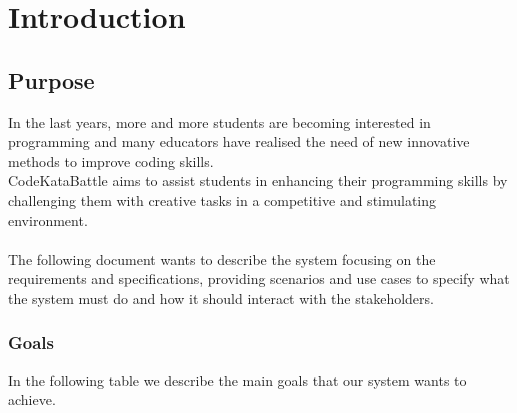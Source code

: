 \chapter{Introduction}

\section{Purpose}
In the last years, more and more students are becoming interested in programming and many educators have realised 
the need of new innovative methods to improve coding skills. \\
CodeKataBattle aims to assist students in enhancing their programming skills by challenging them with creative tasks
 in a competitive and stimulating environment. \\
 \\
 The following document wants to describe the system focusing on the requirements and specifications, providing scenarios 
 and use cases to specify what the system must do and how it should interact with the stakeholders.\\  

 \subsection{Goals}
 In the following table we describe the main goals that our system wants to achieve.\\
 \begin{table}[H]
    \centering
    \end{table}

